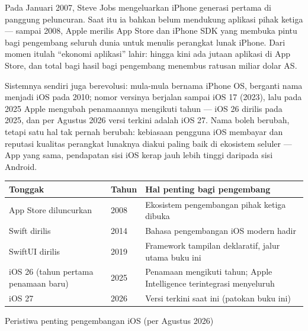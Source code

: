 


Pada Januari 2007, Steve Jobs mengeluarkan iPhone generasi pertama di panggung peluncuran. Saat itu ia bahkan belum mendukung aplikasi pihak ketiga — sampai 2008, Apple merilis App Store dan iPhone SDK yang membuka pintu bagi pengembang seluruh dunia untuk menulis perangkat lunak iPhone. Dari momen itulah “ekonomi aplikasi” lahir: hingga kini ada jutaan aplikasi di App Store, dan total bagi hasil bagi pengembang menembus ratusan miliar dolar AS.

Sistemnya sendiri juga berevolusi: mula-mula bernama iPhone OS, berganti nama menjadi iOS pada 2010; nomor versinya berjalan sampai iOS 17 (2023), lalu pada 2025 Apple mengubah penamaannya mengikuti tahun — iOS 26 dirilis pada 2025, dan per Agustus 2026 versi terkini adalah iOS 27. Nama boleh berubah, tetapi satu hal tak pernah berubah: kebiasaan pengguna iOS membayar dan reputasi kualitas perangkat lunaknya diakui paling baik di ekosistem seluler — App yang sama, pendapatan sisi iOS kerap jauh lebih tinggi daripada sisi Android.

\begin{center}
\begin{tabularx}{\linewidth}{|X|X|X|}
\hline
\textbf{Tonggak} & \textbf{Tahun} & \textbf{Hal penting bagi pengembang} \tabularnewline
\hline
App Store diluncurkan & 2008 & Ekosistem pengembangan pihak ketiga dibuka \tabularnewline
Swift dirilis & 2014 & Bahasa pengembangan iOS modern hadir \tabularnewline
SwiftUI dirilis & 2019 & Framework tampilan deklaratif, jalur utama buku ini \tabularnewline
iOS 26 (tahun pertama penamaan baru) & 2025 & Penamaan mengikuti tahun; Apple Intelligence terintegrasi menyeluruh \tabularnewline
iOS 27 & 2026 & Versi terkini saat ini (patokan buku ini) \tabularnewline
\hline
\end{tabularx}
\end{center}

\begin{center}\small\color{gray}Peristiwa penting pengembangan iOS (per Agustus 2026)\end{center}

